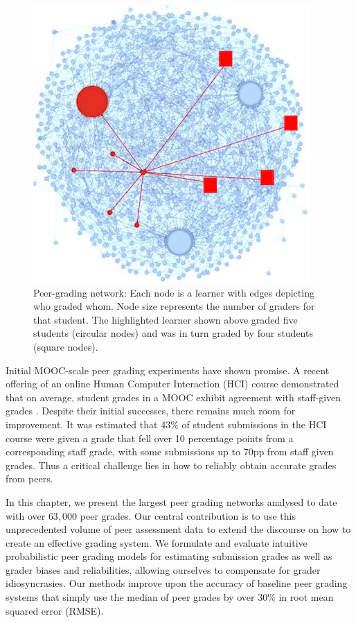 \begin{figure}
\begin{center}
\includegraphics[width=.6\textwidth]{img/assn5GradingGraph_color}
\end{center}
\caption[Example peer grading network]{Peer-grading network: Each node is a learner with edges depicting
who graded whom. Node size represents the number of graders for that student.
The highlighted learner shown above graded five students (circular nodes)
and was in turn graded by four students (square nodes). }
\label{fig:gradingnetwork}
\end{figure}


Initial MOOC-scale peer grading experiments have shown
promise. A recent offering of an online Human Computer Interaction (HCI) course demonstrated that on average, student grades in a MOOC exhibit agreement with staff-given grades \cite{kulkarni13}. Despite their
initial successes, there remains much room for improvement. It was estimated that 43\% of student submissions in the HCI
course were given a grade that fell over 10 percentage points
from a corresponding staff grade, with some submissions up
to 70pp from staff given grades. Thus a critical challenge lies
in how to reliably obtain accurate grades from peers. 

In this chapter, we present the largest peer grading networks analysed to date with over $63,000$ peer grades. Our central contribution is to use this unprecedented volume of peer assessment data to extend the discourse on how to create an effective grading system. We formulate and evaluate  intuitive probabilistic peer grading models for estimating submission grades as well as grader biases and reliabilities, allowing ourselves to compensate for grader idiosyncrasies. Our methods improve upon the accuracy of baseline peer grading systems that simply use the median of peer grades by over $30\%$ in 
root mean squared error (RMSE).

